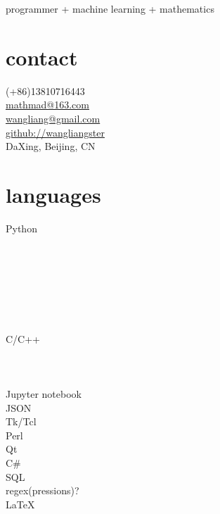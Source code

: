 \documentclass[letterpaper,10pt]{Resume_Liang}
\begin{document}
\thispagestyle{empty}
 {programmer + machine learning + mathematics}
\begin{aside}
  \section{contact}
    (+86)13810716443\\
    \href{mailto:mathmad@163.com}{mathmad@163.com}\\
    \href{mailto:wangliangster@gmail.com}{wangliang@gmail.com}\\
    \href{https://github.com/wangliangster}{github://wangliangster}\\
    DaXing, Beijing, CN\\
   \vspace{\baselineskip}
  \section{languages}
    Python\\
    \\
    \\
    \\
    \\
    \\
    \\
    \\
    C/C++\\
    \\
    \\
    \\
    Jupyter notebook\\
    JSON\\
    Tk/Tcl\\
    Perl\\
    Qt\\
    C\#\\
    SQL\\
    regex(pressions)?\\
    \LaTeX \\
   \vspace{\baselineskip}

\end{aside}
\end{document}
